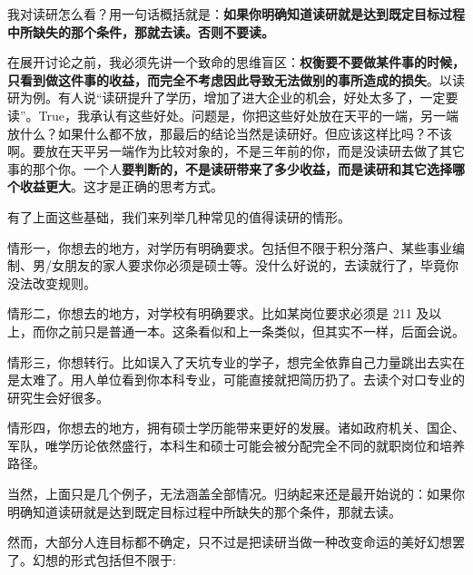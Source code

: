 \documentclass[cn,11pt]{elegantbook}
\begin{document}
我对读研怎么看？用一句话概括就是：\textbf{如果你明确知道读研就是达到既定目标过程中所缺失的那个条件，那就去读。否则不要读。}
	
在展开讨论之前，我必须先讲一个致命的思维盲区：\textbf{权衡要不要做某件事的时候，只看到做这件事的收益，而完全不考虑因此导致无法做别的事所造成的损失}。以读研为例。有人说“读研提升了学历，增加了进大企业的机会，好处太多了，一定要读”。True，我承认有这些好处。问题是，你把这些好处放在天平的一端，另一端放什么？如果什么都不放，那最后的结论当然是读研好。但应该这样比吗？不该啊。要放在天平另一端作为比较对象的，不是三年前的你，而是没读研去做了其它事的那个你。一个人\textbf{要判断的，不是读研带来了多少收益，而是读研和其它选择哪个收益更大}。这才是正确的思考方式。	
	
有了上面这些基础，我们来列举几种常见的值得读研的情形。

情形一，你想去的地方，对学历有明确要求。包括但不限于积分落户、某些事业编制、男/女朋友的家人要求你必须是硕士等。没什么好说的，去读就行了，毕竟你没法改变规则。

情形二，你想去的地方，对学校有明确要求。比如某岗位要求必须是 211 及以上，而你之前只是普通一本。这条看似和上一条类似，但其实不一样，后面会说。

情形三，你想转行。比如误入了天坑专业的学子，想完全依靠自己力量跳出去实在是太难了。用人单位看到你本科专业，可能直接就把简历扔了。去读个对口专业的研究生会好很多。

情形四，你想去的地方，拥有硕士学历能带来更好的发展。诸如政府机关、国企、军队，唯学历论依然盛行，本科生和硕士可能会被分配完全不同的就职岗位和培养路径。

当然，上面只是几个例子，无法涵盖全部情况。归纳起来还是最开始说的：如果你明确知道读研就是达到既定目标过程中所缺失的那个条件，那就去读。

然而，大部分人连目标都不确定，只不过是把读研当做一种改变命运的美好幻想罢了。幻想的形式包括但不限于:
\end{document}
